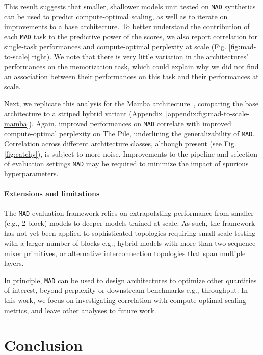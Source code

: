 This result suggests that smaller, shallower models unit tested on {\tt MAD} synthetics can be used to predict compute-optimal scaling, as well as to iterate on improvements to a base architecture. To better understand the contribution of each {\tt MAD} task to the predictive power of the scores, we also report correlation for single-task performances and compute-optimal perplexity at scale (Fig. \ref{fig:mad-to-scale} right). We note that there is very little variation in the architectures' performances on the memorization task, which could explain why we did not find an association between their performances on this task and their performances at scale.

Next, we replicate this analysis for the Mamba architecture~\cite{gu2023mamba}, comparing the base architecture to a striped hybrid variant (Appendix~\ref{appendix:fig:mad-to-scale-mamba}).
Again, improved performances on {\tt MAD} correlate with improved compute-optimal perplexity on The Pile, underlining the generalizability of {\tt MAD}. Correlation across different architecture classes, although present (see Fig. \ref{fig:catchy}), is subject to more noise. Improvements to the pipeline and selection of evaluation settings {\tt MAD} may be required to minimize the impact of spurious hyperparameters.

\paragraph{Extensions and limitations}

The {\tt MAD} evaluation framework relies on extrapolating performance from smaller (e.g., 2-block) models to deeper models trained at scale. As such, the framework has not yet been applied to sophisticated topologies requiring small-scale testing with a larger number of blocks e.g., hybrid models with more than two sequence mixer primitives, or alternative interconnection topologies that span multiple layers.

In principle, {\tt MAD} can be used to design architectures to optimize other quantities of interest, beyond perplexity or downstream benchmarks e.g., throughput. In this work, we focus on investigating correlation with compute-optimal scaling metrics, and leave other analyses to future work.

\section{Conclusion}

